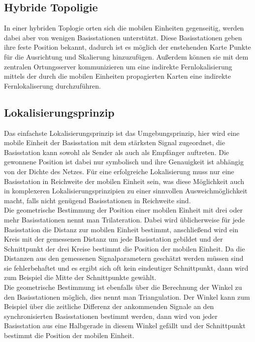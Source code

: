 \subsection{Hybride Topoligie}
In einer hybriden Toplogie orten sich die mobilen Einheiten gegenseitig, werden dabei aber von wenigen Basisstationen unterstützt.
Diese Basisstationen geben ihre feste Position bekannt, dadurch ist es möglich der enstehenden Karte Punkte für die Ausrichtung und Skalierung hinzuzufügen.
Außerdem können sie mit dem zentralen Ortungsserver kommunizieren um eine indirekte Fernlokalisierung mittels der durch die mobilen Einheiten propagierten Karten eine indirekte Fernlokaliserung durchzuführen.

\subsection{Lokalisierungsprinzip}
Das einfachste Lokalisierungsprinzip ist das Umgebungsprinzip, hier wird eine mobile Einheit der Basisstation mit dem stärksten Signal zugeordnet, die Basisstation kann sowohl als Sender als auch als Empfänger auftreten. Die gewonnene Position ist dabei nur symbolisch und ihre Genauigkeit ist abhängig von der Dichte des Netzes. Für eine erfolgreiche Lokalisierung muss nur eine Basisstation in Reichweite der mobilen Einheit sein, was diese Möglichkeit auch in komplexeren Lokalisierungsprinzipien zu einer sinnvollen Ausweichmöglichkeit macht, falls nicht genügend Basisstationen in Reichweite sind. \\
Die geometrische Bestimmung der Position einer mobilen Einheit mit drei oder mehr Basisstationen nennt man Trilateration. Dabei wird üblicherweise für jede Basisstation die Distanz zur mobilen Einheit bestimmt, anschließend wird ein Kreis mit der gemessenen Distanz um jede Basisstation gebildet und der Schnittpunkt der drei Kreise bestimmt die Position der mobilen Einheit. Da die Distanzen aus den gemessenen Signalparametern geschätzt werden müssen sind sie fehlerbehaftet und es ergibt sich oft kein eindeutiger Schnittpunkt, dann wird zum Beispiel die Mitte der Schnittpunkte gewählt. \\
Die geometrische Bestimmung ist ebenfalls über die Berechnung der Winkel zu den Basisstationen möglich, dies nennt man Triangulation. Der Winkel kann zum Beispiel über die zeitliche Differenz der ankommenden Signale an den synchronisierten Basisstationen bestimmt werden, dann wird von jeder Basisstation aus eine Halbgerade in diesem Winkel gefällt und der Schnittpunkt bestimmt die Position der mobilen Einheit. %
